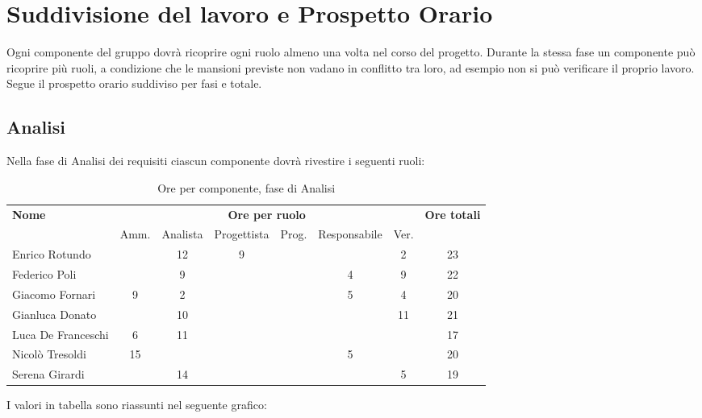 \section{Suddivisione del lavoro e Prospetto Orario}

Ogni componente del gruppo dovrà ricoprire ogni ruolo almeno una volta nel corso del progetto.
Durante la stessa fase un componente può ricoprire più ruoli, a condizione che le mansioni previste non vadano in conflitto tra loro, ad esempio non si può verificare il proprio lavoro.
Segue il prospetto orario suddiviso per fasi e totale. \\

\subsection{Analisi}

Nella fase di Analisi dei requisiti ciascun componente dovrà rivestire i seguenti ruoli:
\begin{table}[H]
\centering
\begin{tabular}{lccccccc}
\toprule 
    \textbf{Nome}  & \multicolumn{6}{c}{\textbf{Ore per ruolo}} & \textbf{Ore totali} \\
     & Amm. & Analista & Progettista & Prog. & Responsabile & Ver. \\
    \midrule
    Enrico Rotundo 		&   & 12 & 9 &  &  & 2 & 23 \\
    Federico Poli 		&   & 9 &  &  & 4 & 9 & 22 \\
    Giacomo Fornari		& 9 & 2 & 	&  & 5 & 4 & 20 \\
    Gianluca Donato 		&   & 10 &  &  &  & 11 & 21 \\
    Luca De Franceschi  & 6 & 11 &  &  &  &  & 17 \\
    Nicolò Tresoldi 		& 15&  &  &  & 5 &  & 20 \\
   	Serena Girardi 		&   & 14 &  &  &  & 5 & 19 \\
    
    \bottomrule
\end{tabular}
\caption{Ore per componente, fase di Analisi}
\end{table}

I valori in tabella sono riassunti nel seguente grafico: \\ \\ \\

